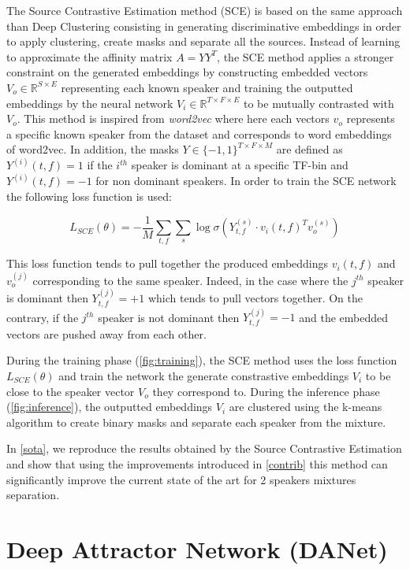 \documentclass[master, tikz, final,11pt, dvipdfmx]{iscs-thesis}
\begin{document}
The Source Contrastive Estimation method (SCE) \cite{SCE} is based on the same approach than Deep Clustering consisting in generating discriminative embeddings in order to apply clustering, create masks and separate all the sources.
Instead of learning to approximate the affinity matrix $A = YY^{T}$, the SCE method applies a stronger constraint on the generated embeddings by constructing embedded vectors $V_o \in \mathbb{R}^{S\times E}$ representing each known speaker and training the outputted embeddings by the neural network $V_i \in \mathbb{R}^{T \times F \times E}$ to be mutually contrasted with $V_o$. This method is inspired from \textit{word2vec} \cite{word2vec} where here each vectors $v_o$ represents a specific known speaker from the dataset and corresponds to word embeddings of word2vec. In addition, the masks $Y \in {\{-1, 1\}}^{T \times F \times M}$ are defined as $Y^{(i)}(t,f) = 1$ if the $i^{th}$ speaker is dominant at a specific TF-bin and $Y^{(i)}(t,f) = -1$ for non dominant speakers. In order to train the SCE network the following loss function is used:

\[L_{SCE}(\theta) = - \frac{1}{M} \sum_{t,f} \sum_{s} \log \sigma(Y_{t,f}^{(s)} \cdot v_i(t,f)^{T} v_o^{(s)})\]

This loss function tends to pull together the produced embeddings $v_i(t,f)$ and $v_o^{(j)}$ corresponding to the same speaker. Indeed, in the case where the $j^{th}$ speaker is dominant then $Y_{t,f}^(j)=+1$ which tends to pull vectors together. On the contrary, if the $j^{th}$ speaker is not dominant then $Y_{t,f}^(j)=-1$ and the embedded vectors are pushed away from each other.

During the training phase (\autoref{fig:training}), the SCE method uses the loss function $L_{SCE}(\theta)$ and train the network the generate constrastive embeddings $V_i$ to be close to the speaker vector $V_o$ they correspond to. During the inference phase (\autoref{fig:inference}), the outputted embeddings $V_i$ are clustered using the k-means algorithm to create binary masks and separate each speaker from the mixture.

In \autoref{sota}, we reproduce the results obtained by the Source Contrastive Estimation and show that using the improvements introduced in \autoref{contrib} this method can significantly improve the current state of the art for 2 speakers mixtures separation.

\section{Deep Attractor Network (DANet)}
\end{document}

